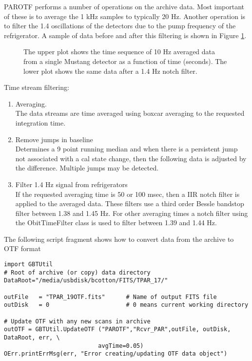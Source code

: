 \documentclass[11pt]{report}
\begin{document}
PAROTF performs a number of operations on the archive data.
Most important of these is to average the 1 kHz samples to typically
20 Hz.
Another operation is to filter the 1.4 oscillations of the detectors
due to the pump frequency of the refrigerator.
A sample of data before and after this filtering is shown in Figure \ref{1.4Hz}.
\begin{figure}
\centerline{}
\centerline{}
\caption{ 
The upper plot shows the time sequence of 10 Hz averaged data from a
single Mustang detector as a function of time (seconds).
The lower plot shows the same data after a 1.4 Hz notch filter.
}
\label{1.4Hz}
\end{figure}

Time stream filtering:
\begin{enumerate}
\item Averaging.\\
The data streams are time averaged using boxcar averaging to the
requested integration time. 
\item Remove jumps in baseline\\
Determines a 9 point running median and when there is a persistent
jump not associated with a cal  state change, then the following
data is adjusted by the difference.   Multiple jumps may be detected.
\item Filter 1.4 Hz signal from refrigerators\\
If the requested averaging time is 50 or 100 msec, then a 
IIR notch filter is applied to the averaged data.
These filters use a third order Bessle bandstop filter between 
1.38 and 1.45 Hz. 
For other averaging times a notch filter using the 
ObitTimeFilter class is used to filter between 1.39 and 1.44 Hz.
\end{enumerate}

The following script fragment shows how to convert data from the
archive to OTF format
\begin{verbatim}
import GBTUtil
# Root of archive (or copy) data directory
DataRoot="/media/usbdisk/bcotton/FITS/TPAR_17/"

outFile   = "TPAR_19OTF.fits"      # Name of output FITS file
outDisk   = 0                      # 0 means current working directory

# Update OTF with any new scans in archive
outOTF = GBTUtil.UpdateOTF ("PAROTF","Rcvr_PAR",outFile, outDisk, DataRoot, err, \
                           avgTime=0.05)
OErr.printErrMsg(err, "Error creating/updating OTF data object")
\end{verbatim}
\end{document}
